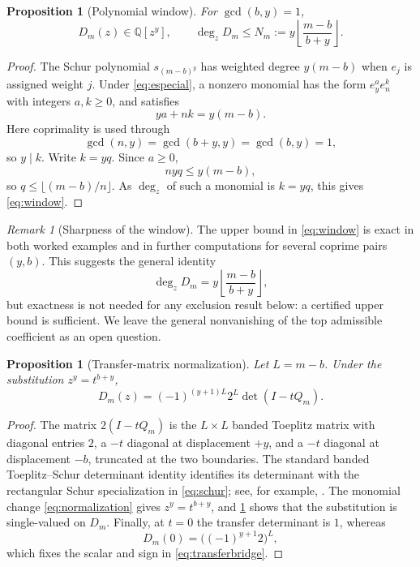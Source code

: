 \documentclass[11pt]{amsart}
\newtheorem{proposition}[theorem]{Proposition}
\theoremstyle{remark}
\newtheorem{remark}[theorem]{Remark}
\newcommand{\Q}{\mathbb{Q}}
\begin{document}
\begin{proposition}[Polynomial window]\label{prop:window}
For $\gcd(b,y)=1$,
\begin{equation}\label{eq:window}
    D_m(z)\in\Q[z^y],
    \qquad
    \deg_zD_m\leq
    N_m:=y\left\lfloor\frac{m-b}{b+y}\right\rfloor.
\end{equation}
\end{proposition}

\begin{proof}
The Schur polynomial $s_{(m-b)^y}$ has weighted degree $y(m-b)$ when $e_j$ is assigned weight $j$.  Under \eqref{eq:especial}, a nonzero monomial has the form $e_y^a e_n^k$ with integers $a,k\geq0$, and satisfies
\[
    ya+nk=y(m-b).
\]
Here coprimality is used through
\[
    \gcd(n,y)=\gcd(b+y,y)=\gcd(b,y)=1,
\]
so $y\mid k$.  Write $k=yq$.  Since $a\geq0$,
\[
    nyq\leq y(m-b),
\]
so $q\leq\lfloor(m-b)/n\rfloor$.  As $\deg_z$ of such a monomial is $k=yq$, this gives \eqref{eq:window}.
\end{proof}

\begin{remark}[Sharpness of the window]\label{rem:windowsharp}
The upper bound in \eqref{eq:window} is exact in both worked examples and in further computations for several coprime pairs $(y,b)$.  This suggests the general identity
\[
    \deg_zD_m=y\left\lfloor\frac{m-b}{b+y}\right\rfloor,
\]
but exactness is not needed for any exclusion result below: a certified upper bound is sufficient.  We leave the general nonvanishing of the top admissible coefficient as an open question.
\end{remark}

\begin{proposition}[Transfer-matrix normalization]\label{prop:transferbridge}
Let $L=m-b$.  Under the substitution $z^y=t^{b+y}$,
\begin{equation}\label{eq:transferbridge}
    D_m(z)
    =(-1)^{(y+1)L}2^L\det(I-tQ_m).
\end{equation}
\end{proposition}

\begin{proof}
The matrix $2(I-tQ_m)$ is the $L\times L$ banded Toeplitz matrix with diagonal entries $2$, a $-t$ diagonal at displacement $+y$, and a $-t$ diagonal at displacement $-b$, truncated at the two boundaries.  The standard banded Toeplitz--Schur determinant identity identifies its determinant with the rectangular Schur specialization in \eqref{eq:schur}; see, for example, \cite{Alexandersson}.  The monomial change \eqref{eq:normalization} gives $z^y=t^{b+y}$, and \cref{prop:window} shows that the substitution is single-valued on $D_m$.  Finally, at $t=0$ the transfer determinant is $1$, whereas
\[
    D_m(0)=\bigl((-1)^{y+1}2\bigr)^L,
\]
which fixes the scalar and sign in \eqref{eq:transferbridge}.
\end{proof}
\end{document}

